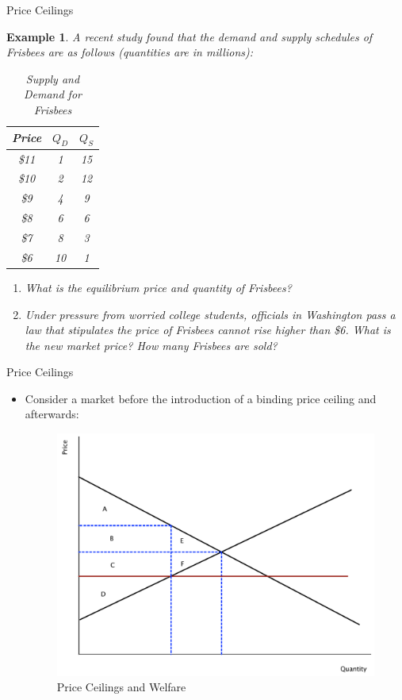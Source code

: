 \documentclass[xcolor={dvipsnames},pdf, hyperref={colorlinks=true, citecolor=ForestGreen, linkcolor=BlueViolet, urlcolor=Magenta}]{beamer}
\newtheorem{exmp}{Example}[section]
\newcommand{\ddp}[1]{{\textcolor{ForestGreen}{#1}}}
\begin{document}
\begin{frame}{Price Ceilings}
	\begin{exmp}
		\scriptsize
		A recent study found that the demand and supply schedules of Frisbees are as follows (quantities are in millions):
		\begin{table}[H]
			\caption{Supply and Demand for Frisbees}

			\centering
			\begin{tabular}{ c|c|c}        
				Price   & $Q_D$ & $Q_S$\\
				\hline
				\$11 & 1 & 15 \\
				\$10 & 2 & 12 \\
				\$9 & 4 & 9 \\
				\$8 & 6 & 6 \\
				\$7 & 8 & 3 \\
				\$6 & 10 & 1 \\
			\end{tabular}
		\end{table} 
	\begin{enumerate}
		\item What is the equilibrium price and quantity of Frisbees? \pause \ddp{$P^* = 8, Q^* = 6$}
		\item Under pressure from worried college students, officials in Washington pass a law that stipulates the price of Frisbees cannot rise higher than \$6. What is the new market price? How many Frisbees are sold? \pause \ddp{$P_C = \$6, Q_C = 1$}
	\end{enumerate}
	\end{exmp}

\end{frame}

\begin{frame}{Price Ceilings}
	\begin{itemize}
	\item 	Consider a market before the introduction of a binding price ceiling and afterwards:
	\begin{figure}[H]
		\centering
		\includegraphics[scale=.35]{plot36.pdf}
		\caption{Price Ceilings and Welfare}
	\end{figure}
\end{itemize}
\end{frame}
\end{document}
